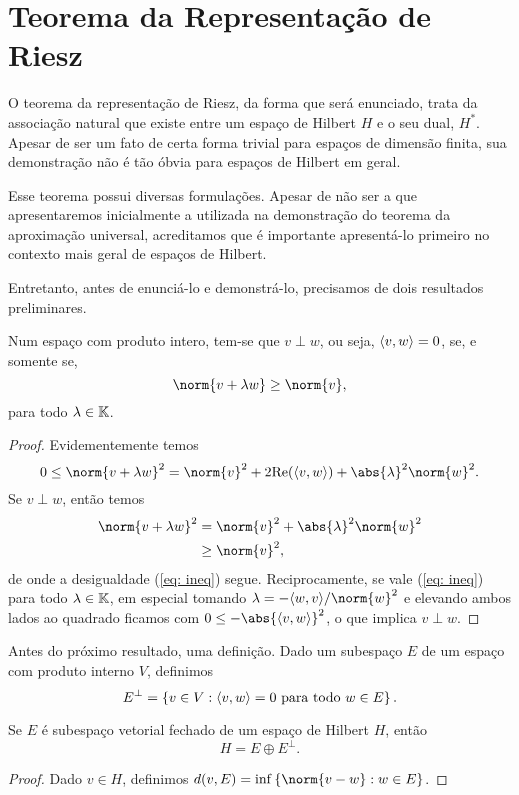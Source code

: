 \section{Teorema da Representação de Riesz}

O teorema da representação de Riesz, da forma que será enunciado, trata da associação natural que existe entre um espaço de Hilbert \( H \) e o seu dual, \( H^{ * } \). Apesar de ser um fato de certa forma trivial para espaços de dimensão finita, sua demonstração não é tão óbvia para espaços de Hilbert em geral.

Esse teorema possui diversas formulações.
Apesar de não ser a que apresentaremos inicialmente a utilizada na demonstração do teorema da aproximação universal, acreditamos que é importante apresentá-lo primeiro no contexto mais geral de espaços de Hilbert.

Entretanto, antes de enunciá-lo e demonstrá-lo, precisamos de dois resultados preliminares.

\begin{lem}
    Num espaço com produto intero, tem-se que \( v \perp w \), ou seja, \( \langle v,w\rangle = 0 \), se, e somente se,
    \begin{equation}
        \norm{ v + \lambda w } \geq \norm{ v }
        \label{eq: ineq}
    ,\end{equation}
    para todo \( \lambda \in \mathbb{K} \).
\end{lem}
\begin{proof}
    Evidementemente temos
    \begin{equation}
        0
        \leq \norm{ v + \lambda w }^2
        = \norm{ v }^2 + 2 \Re (\dotprod{v,w}) + \abs{ \lambda }^2 \norm{ w }^2
    .\end{equation}
    Se \( v \perp w \), então temos
    \begin{align}
        \norm{ v + \lambda w }^2
        &= \norm{ v }^2 + \abs{ \lambda }^2 \norm{ w }^2 \\
        &\geq \norm{ v }^2
    ,\end{align}
    de onde a desigualdade (\ref{eq: ineq}) segue.
    Reciprocamente, se vale (\ref{eq: ineq}) para todo \( \lambda \in \mathbb{K} \), em especial tomando \( \lambda = -\dotprod{w,v}/ \norm{ w }^2 \) e elevando ambos lados ao quadrado ficamos com \( 0 \leq - \abs{ \dotprod{v,w} }^2 \), o que implica \( v \perp w \).
\end{proof}

Antes do próximo resultado, uma definição.
Dado um subespaço \( E \) de um espaço com produto interno \( V \), definimos \[
    E^{ \perp } = \left\{ v \in V : \langle v,w\rangle = 0 \text{ para todo } w \in E \right\}
.\]

\begin{teo}
    Se \( E \) é subespaço vetorial fechado de um espaço de Hilbert \( H \), então 
    \begin{equation}
        H = E \oplus E^{ \perp }
    .\end{equation}
\end{teo}
\begin{proof}
    Dado \( v \in H \), definimos \( d(v, E) = \inf \left\{ \norm{ v - w } : w \in E \right\} \).
\end{proof}